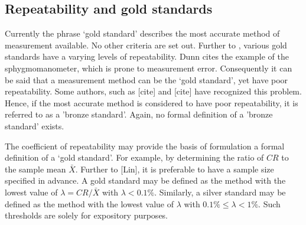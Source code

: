 \documentclass[12pt, a4paper]{article}
\begin{document}
\subsection{Repeatability and gold standards}
Currently the phrase `gold standard' describes the most accurate method of measurement available. No other criteria are set out. Further to \citet{dunnSEME}, various gold standards have a varying levels of repeatability. Dunn cites the example of the sphygmomanometer, which is prone to measurement error. Consequently it can be said that a measurement method can be the `gold standard', yet have poor repeatability. Some authors, such as [cite] and [cite] have recognized this problem. Hence, if the most accurate method is considered to have poor repeatability, it is referred to as a 'bronze standard'.  Again, no formal definition of a 'bronze standard' exists.

The coefficient of repeatability may provide the basis of formulation a formal definition of a `gold standard'. For example, by determining the ratio of $CR$ to the sample mean $\bar{X}$. Further to [Lin], it is preferable to have a sample size specified in advance. A gold standard may be defined as the method with the lowest value of $\lambda = CR /\bar{X}$ with $\lambda < 0.1\%$. Similarly, a silver standard may be defined as the method with the lowest value of $\lambda $ with $0.1\% \leq \lambda < 1\%$. Such thresholds are solely for expository purposes.






\end{document}
